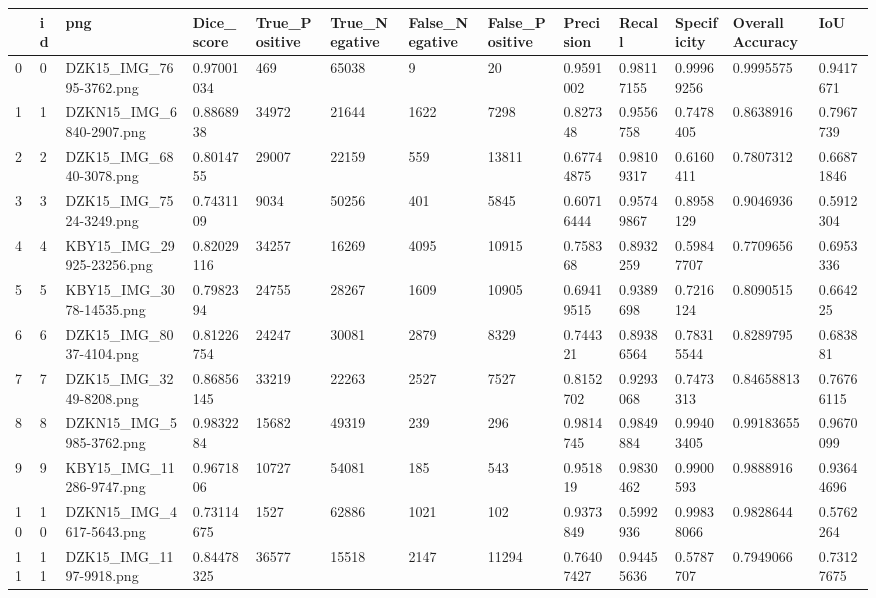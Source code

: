 \documentclass[11pt, a4paper, twoside]{report}
\begin{document}
\begin{longtable}[c]{@{}lllllllllllll@{}}
\toprule
 & id & png & Dice\_score & True\_Positive & True\_Negative & False\_Negative & False\_Positive & Precision & Recall & Specificity & Overall Accuracy & IoU \\* \midrule
\endhead
%
\bottomrule
\endfoot
%
\endlastfoot
%
0 & 0 & DZK15\_IMG\_7695-3762.png & 0.97001034 & 469 & 65038 & 9 & 20 & 0.9591002 & 0.98117155 & 0.99969256 & 0.9995575 & 0.9417671 \\
1 & 1 & DZKN15\_IMG\_6840-2907.png & 0.8868938 & 34972 & 21644 & 1622 & 7298 & 0.827348 & 0.9556758 & 0.7478405 & 0.8638916 & 0.7967739 \\
2 & 2 & DZK15\_IMG\_6840-3078.png & 0.8014755 & 29007 & 22159 & 559 & 13811 & 0.67744875 & 0.98109317 & 0.6160411 & 0.7807312 & 0.66871846 \\
3 & 3 & DZK15\_IMG\_7524-3249.png & 0.7431109 & 9034 & 50256 & 401 & 5845 & 0.60716444 & 0.95749867 & 0.8958129 & 0.9046936 & 0.5912304 \\
4 & 4 & KBY15\_IMG\_29925-23256.png & 0.82029116 & 34257 & 16269 & 4095 & 10915 & 0.758368 & 0.8932259 & 0.59847707 & 0.7709656 & 0.6953336 \\
5 & 5 & KBY15\_IMG\_3078-14535.png & 0.7982394 & 24755 & 28267 & 1609 & 10905 & 0.69419515 & 0.9389698 & 0.7216124 & 0.8090515 & 0.664225 \\
6 & 6 & DZK15\_IMG\_8037-4104.png & 0.81226754 & 24247 & 30081 & 2879 & 8329 & 0.744321 & 0.89386564 & 0.78315544 & 0.8289795 & 0.683881 \\
7 & 7 & DZK15\_IMG\_3249-8208.png & 0.86856145 & 33219 & 22263 & 2527 & 7527 & 0.8152702 & 0.9293068 & 0.7473313 & 0.84658813 & 0.76766115 \\
8 & 8 & DZKN15\_IMG\_5985-3762.png & 0.9832284 & 15682 & 49319 & 239 & 296 & 0.9814745 & 0.9849884 & 0.99403405 & 0.99183655 & 0.9670099 \\
9 & 9 & KBY15\_IMG\_11286-9747.png & 0.9671806 & 10727 & 54081 & 185 & 543 & 0.951819 & 0.9830462 & 0.9900593 & 0.9888916 & 0.93644696 \\
10 & 10 & DZKN15\_IMG\_4617-5643.png & 0.73114675 & 1527 & 62886 & 1021 & 102 & 0.9373849 & 0.5992936 & 0.99838066 & 0.9828644 & 0.5762264 \\
11 & 11 & DZK15\_IMG\_1197-9918.png & 0.84478325 & 36577 & 15518 & 2147 & 11294 & 0.76407427 & 0.94455636 & 0.5787707 & 0.7949066 & 0.73127675 \\

\end{longtable}
\end{document}
